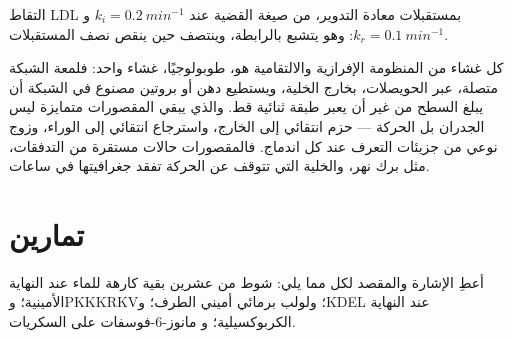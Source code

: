 \begin{omfigure}

{\small التقاط LDL بمستقبلات معادة التدوير، من صيغة
القضية عند $k_{i} = \qty{0.2}{min^{-1}}$ و$k_{r} =
\qty{0.1}{min^{-1}}$: وهو يتشبع بالرابطة، وينتصف حين ينقص نصف
المستقبلات.}
\end{omfigure}

\begin{remark}\label{rem:b3:membrane-traffic:one-membrane}
كل غشاء من المنظومة الإفرازية والالتقامية هو، طوبولوجيًا،
غشاء واحد: فلمعة الشبكة متصلة، عبر
الحويصلات، بخارج الخلية، ويستطيع دهن أو بروتين مصنوع في
الشبكة أن يبلغ السطح من غير أن يعبر طبقة ثنائية قط.
والذي يبقي المقصورات متمايزة ليس الجدران بل الحركة ---
حزم انتقائي إلى الخارج، واسترجاع انتقائي إلى الوراء، وزوج
نوعي من جزيئات التعرف عند كل اندماج. فالمقصورات حالات
مستقرة من التدفقات، مثل برك نهر، والخلية التي تتوقف عن
الحركة تفقد جغرافيتها في ساعات.
\end{remark}

\section{تمارين}

\begin{exercise}[$\star$]\label{exo:b3:membrane-traffic:1}
أعطِ الإشارة والمقصد لكل مما يلي: شوط من عشرين
بقية كارهة للماء عند النهاية الأمينية؛ وPKKKRKV؛ ولولب
برمائي أميني الطرف؛ وKDEL عند النهاية الكربوكسيلية؛ و
مانوز-6-فوسفات على السكريات.
\end{exercise}

